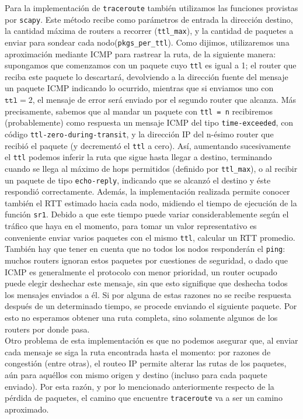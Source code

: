  Para la implementaci\'on de \texttt{traceroute} también utilizamos las funciones provistas por \texttt{scapy}. Este m\'etodo recibe como par\'ametros de entrada la direcci\'on destino, la cantidad m\'axima de routers a recorrer (\texttt{ttl\_max}), y la cantidad de paquetes a enviar para sondear cada nodo(\texttt{pkgs\_per\_ttl}). Como dijimos, utilizaremos una aproximación mediante ICMP para rastrear la ruta, de la siguiente manera: supongamos que comenzamos con un paquete cuyo \texttt{ttl} es igual a 1; el router que reciba este paquete lo descartará, devolviendo a la direcci\'on fuente del mensaje un paquete ICMP indicando lo ocurrido, mientras que si enviamos uno con $\texttt{ttl} = 2$, el mensaje de error será enviado por el segundo router que alcanza. M\'as precisamente, sabemos que al mandar un paquete con \texttt{ttl = n} recibiremos (probablemente) como respuesta un mensaje ICMP del tipo \texttt{time-exceeded}, con c\'odigo \texttt{ttl-zero-during-transit}, y la direcci\'on IP del n-ésimo router que recibió el paquete (y decrement\'o el \texttt{ttl} a cero). Así, aumentando sucesivamente el \texttt{ttl}  podemos inferir la ruta que sigue hasta llegar a destino, terminando cuando se llega al m\'aximo de hops permitidos (definido por \texttt{ttl\_max}), o al recibir un paquete de tipo \texttt{echo-reply}, indicando que se alcanzó el destino y éste respondi\'o correctamente. Además, la implementaci\'on realizada permite conocer tambi\'en el RTT estimado hacia cada nodo, midiendo el tiempo de ejecuci\'on de la funci\'on \texttt{sr1}. Debido a que este tiempo puede variar considerablemente seg\'un el tr\'afico que haya en el momento, para tomar un valor representativo es conveniente enviar varios paquetes con el mismo \texttt{ttl}, calcular un RTT promedio.\\
 
 También hay que tener en cuenta que no todos los nodos responderán el \texttt{ping}: muchos routers ignoran estos paquetes por cuestiones de seguridad, o dado que ICMP es generalmente el protocolo con menor prioridad, un router ocupado puede elegir deshechar este mensaje, sin que esto signifique que deshecha todos los mensajes enviados a \'el. Si por alguna de estas razones no se recibe respuesta después de un determinado tiempo, se procede enviando el siguiente paquete. Por esto no esperamos obtener una ruta completa, sino solamente algunos de los routers por donde pasa.\\
 
 Otro problema de esta implementaci\'on es que no podemos asegurar que, al enviar cada mensaje se siga la ruta encontrada hasta el momento: por razones de congesti\'on (entre otras), el routeo IP permite alterar las rutas de los paquetes, aún para aquéllos con mismo origen y destino (incluso para cada paquete enviado). Por esta raz\'on, y por lo mencionado anteriormente respecto de la p\'erdida de paquetes, el camino que encuentre \texttt{traceroute} va a ser un camino aproximado. \\
 
